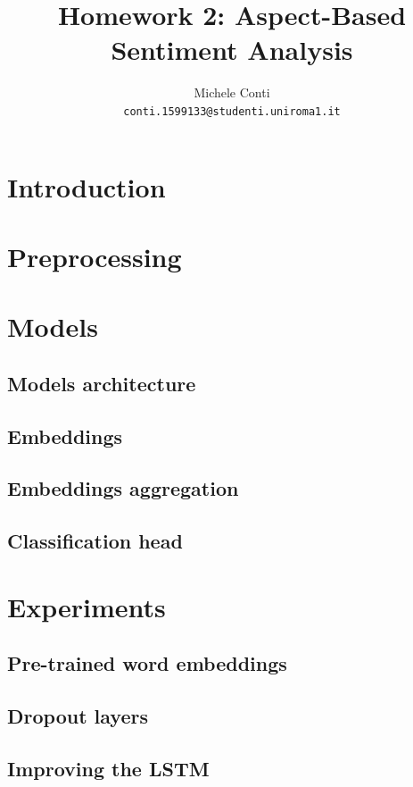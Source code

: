 \documentclass[11pt,a4paper]{article}
\title{Homework 2: Aspect-Based Sentiment Analysis}
\author{Michele Conti \\
	\texttt{conti.1599133@studenti.uniroma1.it}\\}
\date{}
\begin{document}
	\maketitle
	\section{Introduction}
	

	\section{Preprocessing}	

	\section{Models}
	\subsection{Models architecture}
	
	\subsection{Embeddings}
	
	\subsection{Embeddings aggregation}
	
	\subsection{Classification head}
	
	\section{Experiments}
	
	\subsection{Pre-trained word embeddings}
	
	\subsection{Dropout layers}
	
	\subsection{Improving the LSTM}
	
\end{document}
